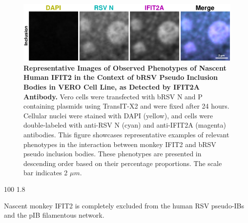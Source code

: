 \begin{figure}
    \centering
    \includegraphics[width=1\linewidth]{08. Chapter 3/Figs/03. pIB/03. IFIT2/02. IFIT2A/09. i2a-vero-bnbp.pdf} 
    \caption[Representative Images of Observed Phenotypes of Nascent Human IFIT2 in the Context of bRSV Pseudo Inclusion Bodies in VERO Cell Line, as Detected by IFIT2A Antibody.]{\textbf{Representative Images of Observed Phenotypes of Nascent Human IFIT2 in the Context of bRSV Pseudo Inclusion Bodies in VERO Cell Line, as Detected by IFIT2A Antibody.} Vero cells were transfected with bRSV N and P containing plasmids using TransIT-X2 and were fixed after 24 hours. Cellular nuclei were stained with DAPI (yellow), and cells were double-labeled with anti-RSV N (cyan) and anti-IFIT2A (magenta) antibodies. This figure showcases representative examples of relevant phenotypes in the interaction between monkey IFIT2 and bRSV pseudo inclusion bodies. These phenotypes are presented in descending order based on their percentage proportions. The scale bar indicates 2 \(\mu m\).}
    \label{fig:Representative Images of Observed Phenotypes of Nascent Human IFIT2 in the Context of bRSV Pseudo Inclusion Bodies in VERO Cell Line, as Detected by IFIT2A Antibody}
\end{figure}

100
1.8

Nascent monkey IFIT2 is completely excluded from the human RSV pseudo-IBs and the pIB filamentous network.

